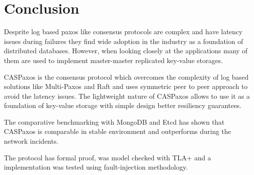 \documentclass[12pt]{article}
\theoremstyle{definition}
\begin{document}
\section{Conclusion}

Desprite log based paxos like consensus protocols are complex and have latency issues during failures they find wide adoption in the industry as a foundation of distributed databases. However, when looking closely at the applications many of them are used to implement master-master replicated key-value storages.

CASPaxos is the consensus protocol which overcomes the complexity of log based solutions like Multi-Paxos and Raft and uses symmetric peer to peer approach to avoid the latency issues. The lightweight nature of CASPaxos allows to use it as a foundation of key-value storage with simple design better resiliency guarantees.

The comparative benchmarking with MongoDB and Etcd has shown that CASPaxos is comparable in stable environment and outperforms during the network incidents.

The protocol has formal proof, was model checked with TLA+ and a implementation was tested using fault-injection methodology.
\end{document}
